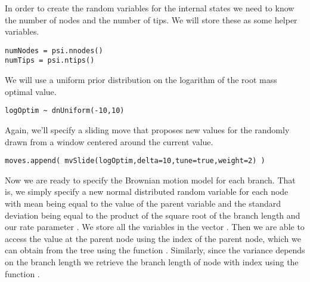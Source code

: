 In order to create the random variables for the internal states we need to know the number of nodes and the number of tips.
We will store these as some helper variables.
{\tt \small \begin{snugshade*}
\begin{lstlisting}
numNodes = psi.nnodes()
numTips = psi.ntips()
\end{lstlisting}
\end{snugshade*}}

We will use a uniform prior distribution on the logarithm of the root mass optimal value.
{\tt \small \begin{snugshade*}
\begin{lstlisting}
logOptim ~ dnUniform(-10,10)
\end{lstlisting}
\end{snugshade*}}
Again, we'll specify a sliding move that proposes new values for the  randomly drawn from a window centered around the current value.
{\tt \small \begin{snugshade*}
\begin{lstlisting}
moves.append( mvSlide(logOptim,delta=10,tune=true,weight=2) )
\end{lstlisting}
\end{snugshade*}}

Now we are ready to specify the Brownian motion model for each branch.
That is, we simply specify a new normal distributed random variable for each node with mean being equal to the value of the parent variable and the standard deviation being equal to the product of the square root of the branch length and our rate parameter . We store all the variables in the vector . Then we are able to access the value at the parent node using the index of the parent node, which we can obtain from the tree using the function . Similarly, since the variance depends on the branch length we retrieve the branch length of node with index  using the function .

